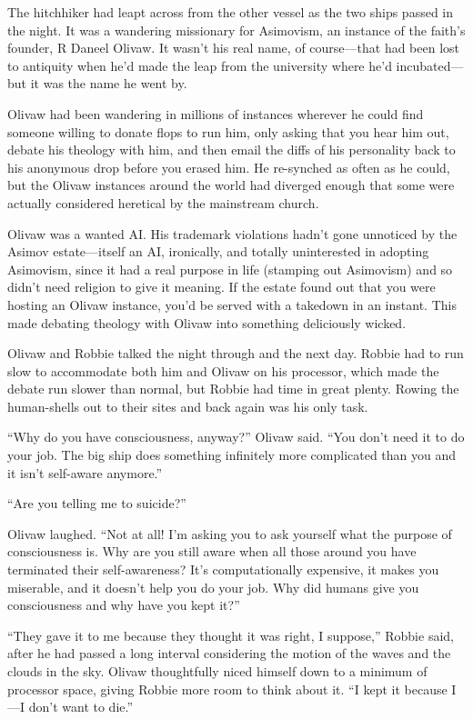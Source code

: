 The hitchhiker had leapt across from the other vessel as the two
ships passed in the night. It was a wandering missionary for
Asimovism, an instance of the faith’s founder, R Daneel Olivaw. It
wasn’t his real name, of course—that had been lost to antiquity
when he’d made the leap from the university where he’d
incubated—but it was the name he went by.

Olivaw had been wandering in millions of instances wherever he
could find someone willing to donate flops to run him, only asking
that you hear him out, debate his theology with him, and then email
the diffs of his personality back to his anonymous drop before you
erased him. He re-synched as often as he could, but the Olivaw
instances around the world had diverged enough that some were
actually considered heretical by the mainstream church.

Olivaw was a wanted AI. His trademark violations hadn’t gone
unnoticed by the Asimov estate—itself an AI, ironically, and
totally uninterested in adopting Asimovism, since it had a real
purpose in life (stamping out Asimovism) and so didn’t need
religion to give it meaning. If the estate found out that you were
hosting an Olivaw instance, you’d be served with a takedown in an
instant. This made debating theology with Olivaw into something
deliciously wicked.

Olivaw and Robbie talked the night through and the next day. Robbie
had to run slow to accommodate both him and Olivaw on his
processor, which made the debate run slower than normal, but Robbie
had time in great plenty. Rowing the human-shells out to their
sites and back again was his only task.

“Why do you have consciousness, anyway?” Olivaw said. “You don’t
need it to do your job. The big ship does something infinitely more
complicated than you and it isn’t self-aware anymore.”

“Are you telling me to suicide?”

Olivaw laughed. “Not at all! I’m asking you to ask yourself what
the purpose of consciousness is. Why are you still aware when all
those around you have terminated their self-awareness? It’s
computationally expensive, it makes you miserable, and it doesn’t
help you do your job. Why did humans give you consciousness and why
have you kept it?”

“They gave it to me because they thought it was right, I suppose,”
Robbie said, after he had passed a long interval considering the
motion of the waves and the clouds in the sky. Olivaw thoughtfully
niced himself down to a minimum of processor space, giving Robbie
more room to think about it. “I kept it because I—I don’t want to
die.”


